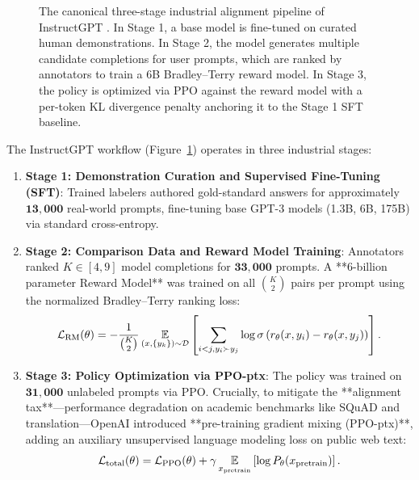 \documentclass[../../main.tex]{subfiles}
\begin{document}
\begin{figure}[t]
\caption{The canonical three-stage industrial alignment pipeline of InstructGPT \citep{ouyang2022}. In Stage 1, a base model is fine-tuned on curated human demonstrations. In Stage 2, the model generates multiple candidate completions for user prompts, which are ranked by annotators to train a 6B Bradley--Terry reward model. In Stage 3, the policy is optimized via PPO against the reward model with a per-token KL divergence penalty anchoring it to the Stage 1 SFT baseline.}
\label{fig:instructgpt_pipeline}
\end{figure}

The InstructGPT workflow (Figure~\ref{fig:instructgpt_pipeline}) operates in three industrial stages:
\begin{enumerate}
    \item \textbf{Stage 1: Demonstration Curation and Supervised Fine-Tuning (SFT)}: Trained labelers authored gold-standard answers for approximately $\mathbf{13{,}000}$ real-world prompts, fine-tuning base GPT-3 models (1.3B, 6B, 175B) via standard cross-entropy.
    \item \textbf{Stage 2: Comparison Data and Reward Model Training}: Annotators ranked $K \in [4, 9]$ model completions for $\mathbf{33{,}000}$ prompts. A **6-billion parameter Reward Model** was trained on all $\binom{K}{2}$ pairs per prompt using the normalized Bradley--Terry ranking loss:
    \begin{equation}
    \mathcal{L}_{\text{RM}}(\theta) = -\frac{1}{\binom{K}{2}} \operatorname*{\mathbb{E}}_{(x, \{y_k\}) \sim \mathcal{D}} \left[ \sum_{i < j, y_i \succ y_j} \log \sigma\left(r_\theta(x, y_i) - r_\theta(x, y_j)\right) \right].
    \end{equation}
    \item \textbf{Stage 3: Policy Optimization via PPO-ptx}: The policy was trained on $\mathbf{31{,}000}$ unlabeled prompts via PPO. Crucially, to mitigate the **alignment tax**---performance degradation on academic benchmarks like SQuAD and translation---OpenAI introduced **pre-training gradient mixing (PPO-ptx)**, adding an auxiliary unsupervised language modeling loss on public web text:
    \begin{equation}
    \mathcal{L}_{\text{total}}(\theta) = \mathcal{L}_{\text{PPO}}(\theta) + \gamma \operatorname*{\mathbb{E}}_{x_{\text{pretrain}}} \left[ \log P_\theta(x_{\text{pretrain}}) \right].
    \end{equation}
\end{enumerate}
\end{document}
